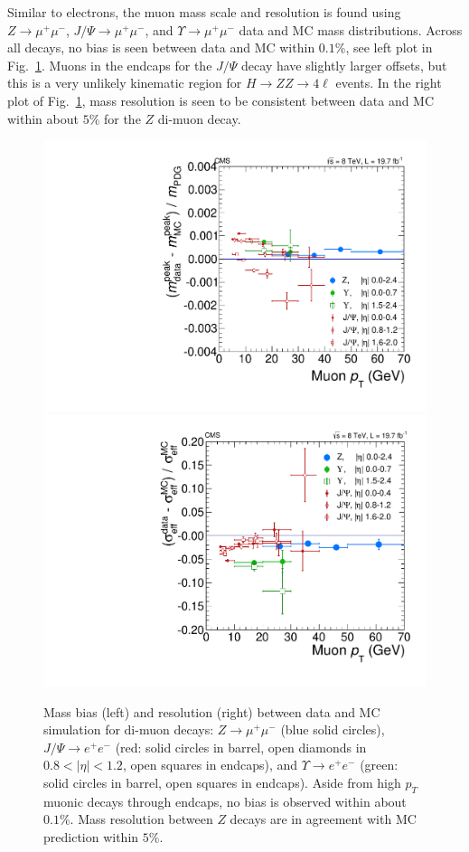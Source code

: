Similar to electrons, the muon mass scale and resolution is found using $Z\rightarrow \mu^+\mu^-$, $J/\Psi \rightarrow \mu^+\mu^-$, and $\Upsilon \rightarrow \mu^+\mu^-$ data and MC mass distributions. Across all decays, no bias is seen between data and MC within $0.1\%$, see left plot in Fig.~\ref{fig:MuonMassResolutionandBias}. Muons in the endcaps for the $J/\Psi$ decay have slightly larger offsets, but this is a very unlikely kinematic region for $H\rightarrow ZZ \rightarrow 4\ell$ events. In the right plot of Fig.~\ref{fig:MuonMassResolutionandBias}, mass resolution is seen to be consistent between data and MC within about $5\%$ for the $Z$ di-muon decay.

\begin{figure}[htbp]
\begin{center}
\includegraphics[width=.45\linewidth]{HiggsDiscovery/figures/100_scale_mf.pdf}
\includegraphics[width=.45\linewidth]{HiggsDiscovery/figures/100_resolution_mf.pdf}
\caption[Mass Resolution and Bias from Di-muon Decays]{Mass bias (left) and resolution (right) between data and MC simulation for di-muon decays: $Z\rightarrow \mu^+\mu^-$ (blue solid circles), $J/\Psi\rightarrow e^+e^-$ (red: solid circles in barrel, open diamonds in $0.8<|\eta|<1.2$, open squares in endcaps), and $\Upsilon\rightarrow e^+e^-$ (green: solid circles in barrel, open squares in endcaps). Aside from high $p_T$ muonic decays through endcaps, no bias is observed within about $0.1\%$. Mass resolution between $Z$ decays are in agreement with MC prediction within $5\%$.}
\label{fig:MuonMassResolutionandBias}
\end{center}
\end{figure}

